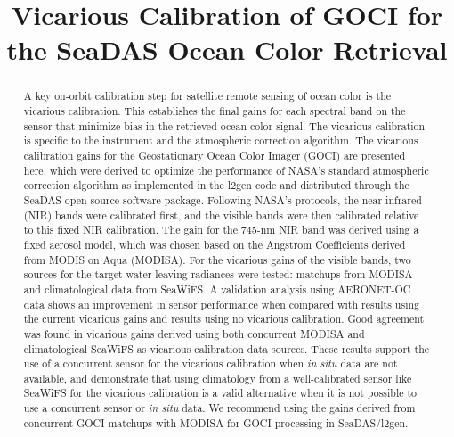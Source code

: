 \documentclass[]{interact}
\theoremstyle{plain}%
\theoremstyle{definition}
\theoremstyle{remark}
\begin{document}

\title{Vicarious Calibration of GOCI for the SeaDAS Ocean Color Retrieval}

\author{
}

\maketitle

\begin{abstract}

A key on-orbit calibration step for satellite remote sensing of ocean color is the vicarious calibration.
This establishes the final gains for each spectral band on the sensor that minimize bias in the retrieved ocean color signal.
The vicarious calibration is specific to the instrument and the atmospheric correction algorithm.
The vicarious calibration gains for the Geostationary Ocean Color Imager (GOCI) are presented here, which were derived to optimize the performance of NASA's standard atmospheric correction algorithm as implemented in the l2gen code and distributed through the SeaDAS open-source software package.
Following NASA's protocols, the near infrared (NIR) bands were calibrated first, and the visible bands were then calibrated relative to this fixed NIR calibration.
The gain for the 745-nm NIR band was derived using a fixed aerosol model, which was chosen based on the Angstrom Coefficients derived from MODIS on Aqua (MODISA). 
For the vicarious gains of the visible bands, two sources for the target water-leaving radiances were tested: matchups from MODISA and climatological data from SeaWiFS. 
A validation analysis using AERONET-OC data shows an improvement in sensor performance when compared with results using the current vicarious gains and results using no vicarious calibration. 
Good agreement was found in vicarious gains derived using both concurrent MODISA and climatological SeaWiFS as vicarious calibration data sources.  
These results support the use of a concurrent sensor for the vicarious calibration when {\it in situ} data are not available, and demonstrate that using climatology from a well-calibrated sensor like SeaWiFS for the vicarious calibration is a valid alternative when it is not possible to use a concurrent sensor or {\it in situ} data. 
We recommend using the gains derived from concurrent GOCI matchups with MODISA for GOCI processing in SeaDAS/l2gen.
%
\end{abstract}
\end{document}
